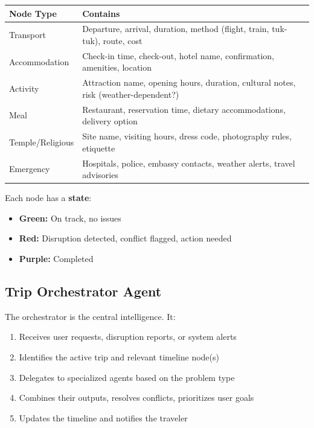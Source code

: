 \documentclass[11pt]{article}
\begin{document}
\begin{table}[H]\centering\small
\begin{tabular}{|l|p{3.5in}|}
\hline
\textbf{Node Type} & \textbf{Contains} \\
\hline
Transport & Departure, arrival, duration, method (flight, train, tuk-tuk), route, cost \\
\hline
Accommodation & Check-in time, check-out, hotel name, confirmation, amenities, location \\
\hline
Activity & Attraction name, opening hours, duration, cultural notes, risk (weather-dependent?) \\
\hline
Meal & Restaurant, reservation time, dietary accommodations, delivery option \\
\hline
Temple/Religious & Site name, visiting hours, dress code, photography rules, etiquette \\
\hline
Emergency & Hospitals, police, embassy contacts, weather alerts, travel advisories \\
\hline
\end{tabular}
\end{table}

Each node has a \textbf{state}:
\begin{itemize}
    \item \textbf{Green:} On track, no issues
    \item \textbf{Red:} Disruption detected, conflict flagged, action needed
    \item \textbf{Purple:} Completed
\end{itemize}

\subsection{Trip Orchestrator Agent}

The orchestrator is the central intelligence. It:
\begin{enumerate}
    \item Receives user requests, disruption reports, or system alerts
    \item Identifies the active trip and relevant timeline node(s)
    \item Delegates to specialized agents based on the problem type
    \item Combines their outputs, resolves conflicts, prioritizes user goals
    \item Updates the timeline and notifies the traveler
\end{enumerate}
\end{document}
